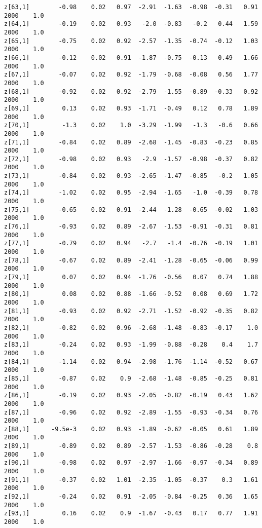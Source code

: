 \documentclass[11pt]{article}
\begin{document}
\begin{Verbatim}[commandchars=\\\{\}]
z[63,1]        -0.98    0.02   0.97  -2.91  -1.63  -0.98  -0.31   0.91   2000    1.0
z[64,1]        -0.19    0.02   0.93   -2.0  -0.83   -0.2   0.44   1.59   2000    1.0
z[65,1]        -0.75    0.02   0.92  -2.57  -1.35  -0.74  -0.12   1.03   2000    1.0
z[66,1]        -0.12    0.02   0.91  -1.87  -0.75  -0.13   0.49   1.66   2000    1.0
z[67,1]        -0.07    0.02   0.92  -1.79  -0.68  -0.08   0.56   1.77   2000    1.0
z[68,1]        -0.92    0.02   0.92  -2.79  -1.55  -0.89  -0.33   0.92   2000    1.0
z[69,1]         0.13    0.02   0.93  -1.71  -0.49   0.12   0.78   1.89   2000    1.0
z[70,1]         -1.3    0.02    1.0  -3.29  -1.99   -1.3   -0.6   0.66   2000    1.0
z[71,1]        -0.84    0.02   0.89  -2.68  -1.45  -0.83  -0.23   0.85   2000    1.0
z[72,1]        -0.98    0.02   0.93   -2.9  -1.57  -0.98  -0.37   0.82   2000    1.0
z[73,1]        -0.84    0.02   0.93  -2.65  -1.47  -0.85   -0.2   1.05   2000    1.0
z[74,1]        -1.02    0.02   0.95  -2.94  -1.65   -1.0  -0.39   0.78   2000    1.0
z[75,1]        -0.65    0.02   0.91  -2.44  -1.28  -0.65  -0.02   1.03   2000    1.0
z[76,1]        -0.93    0.02   0.89  -2.67  -1.53  -0.91  -0.31   0.81   2000    1.0
z[77,1]        -0.79    0.02   0.94   -2.7   -1.4  -0.76  -0.19   1.01   2000    1.0
z[78,1]        -0.67    0.02   0.89  -2.41  -1.28  -0.65  -0.06   0.99   2000    1.0
z[79,1]         0.07    0.02   0.94  -1.76  -0.56   0.07   0.74   1.88   2000    1.0
z[80,1]         0.08    0.02   0.88  -1.66  -0.52   0.08   0.69   1.72   2000    1.0
z[81,1]        -0.93    0.02   0.92  -2.71  -1.52  -0.92  -0.35   0.82   2000    1.0
z[82,1]        -0.82    0.02   0.96  -2.68  -1.48  -0.83  -0.17    1.0   2000    1.0
z[83,1]        -0.24    0.02   0.93  -1.99  -0.88  -0.28    0.4    1.7   2000    1.0
z[84,1]        -1.14    0.02   0.94  -2.98  -1.76  -1.14  -0.52   0.67   2000    1.0
z[85,1]        -0.87    0.02    0.9  -2.68  -1.48  -0.85  -0.25   0.81   2000    1.0
z[86,1]        -0.19    0.02   0.93  -2.05  -0.82  -0.19   0.43   1.62   2000    1.0
z[87,1]        -0.96    0.02   0.92  -2.89  -1.55  -0.93  -0.34   0.76   2000    1.0
z[88,1]      -9.5e-3    0.02   0.93  -1.89  -0.62  -0.05   0.61   1.89   2000    1.0
z[89,1]        -0.89    0.02   0.89  -2.57  -1.53  -0.86  -0.28    0.8   2000    1.0
z[90,1]        -0.98    0.02   0.97  -2.97  -1.66  -0.97  -0.34   0.89   2000    1.0
z[91,1]        -0.37    0.02   1.01  -2.35  -1.05  -0.37    0.3   1.61   2000    1.0
z[92,1]        -0.24    0.02   0.91  -2.05  -0.84  -0.25   0.36   1.65   2000    1.0
z[93,1]         0.16    0.02    0.9  -1.67  -0.43   0.17   0.77   1.91   2000    1.0

\end{Verbatim}
\end{document}
